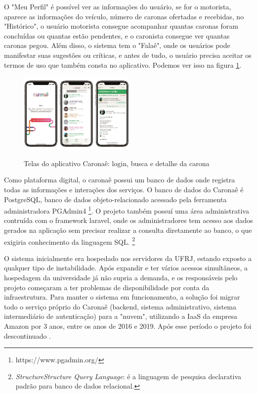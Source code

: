 O "Meu Perfil" é possível ver as informações do usuário, se for o motorista, aparece as informações do veículo, número de caronas ofertadas e recebidas, no "Histórico", o usuário motorista consegue acompanhar quantas caronas foram concluídas ou quantas estão pendentes, e o caronista consegue ver quantas caronas pegou. Além disso, o sistema tem o "Falaê", onde os usuários pode manifestar suas sugestões ou críticas, e antes de tudo, o usuário precisa aceitar os termos de uso que também consta no aplicativo. Podemos ver isso na figura \ref{fig:telas_caronae}. 

\begin{figure}[!hbtp]
	\centering
	\caption{Telas do aplicativo Caronaê: login, busca e detalhe da carona}
	\includegraphics[width=0.5\textwidth]{./04-figuras/caronae-img-artigo.png}
	\label{fig:telas_caronae}
\end{figure}


Como plataforma digital, o caronaê possui um banco de dados onde registra todas as informações e interações dos serviços. O banco de dados do Caronaê é PostgreSQL, banco de dados objeto-relacionado acessado pela ferramenta administradora PGAdmin4 \footnote{https://www.pgadmin.org/}. O projeto também possuí uma área administrativa contruída com o framework laravel, onde os administradores tem acesso aos dados gerados na aplicação sem precisar realizar a consulta diretamente ao banco, o que exigiria conhecimento da linguagem SQL. \footnote{\textit{StructureStructure Query Language}: é a linguagem de pesquisa declarativa padrão para banco de dados relacional.} 

O sistema inicialmente era hospedado nos servidores da UFRJ, estando exposto a qualquer tipo de instabilidade. Após expandir e ter vários acessos simultâneos, a hospedagem da universidade já não supria a demanda, e os responsáveis pelo projeto começaram a ter problemas de disponibilidade por conta da infraestrutura. Para manter o sistema em funcionamento, a solução foi migrar todo o serviço próprio do Caronaê (backend, sistema administrativo, sistema intermediário de autenticação) para a "nuvem", utilizando a IaaS da empresa Amazon por 3 anos, entre os anos de 2016 e 2019. Após esse período o projeto foi descontinuado \cite{caronae}. 

